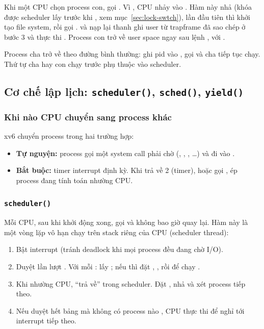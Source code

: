 Khi một CPU chọn process con,  gọi
. Vì , CPU
nhảy vào . Hàm này nhả  (khóa được scheduler lấy
trước khi , xem mục~\ref{sec:lock-swtch}), lần đầu tiên thì khởi
tạo file system, rồi gọi .  và
 nạp lại thanh ghi user từ trapframe đã sao chép ở bước 3 và
thực thi . Process con trở về user space ngay sau lệnh ,
với .

Process cha trở về theo đường bình thường:  ghi pid vào
,  gọi  và cha tiếp tục chạy. Thứ
tự cha hay con chạy trước phụ thuộc vào scheduler.

\subsection{Cơ chế lập lịch: \texttt{scheduler()}, \texttt{sched()}, \texttt{yield()}}
\label{sec:sched}

\subsubsection{Khi nào CPU chuyển sang process khác}

xv6 chuyển process trong hai trường hợp:
\begin{itemize}
  \item \textbf{Tự nguyện:} process gọi một system call phải chờ (,
        , , \ldots) và đi vào .
  \item \textbf{Bắt buộc:} timer interrupt định kỳ. Khi  trả
        về 2 (timer),  hoặc  gọi
        , ép process đang tính toán nhường CPU.
\end{itemize}

\subsubsection{\texttt{scheduler()}}

Mỗi CPU, sau khi khởi động xong, gọi  và không bao giờ
quay lại. Hàm này là một vòng lặp vô hạn chạy trên stack riêng của CPU
(scheduler thread):

\begin{enumerate}
  \item Bật interrupt (tránh deadlock khi mọi process đều đang chờ I/O).
  \item Duyệt lần lượt . Với mỗi : lấy
        ; nếu  thì đặt
        , , rồi
         để chạy .
  \item Khi  nhường CPU,  ``trả về'' trong scheduler. Đặt
        , nhả  và xét process tiếp theo.
  \item Nếu duyệt hết bảng mà không có process nào , CPU thực thi
         để nghỉ tới interrupt tiếp theo.
\end{enumerate}

